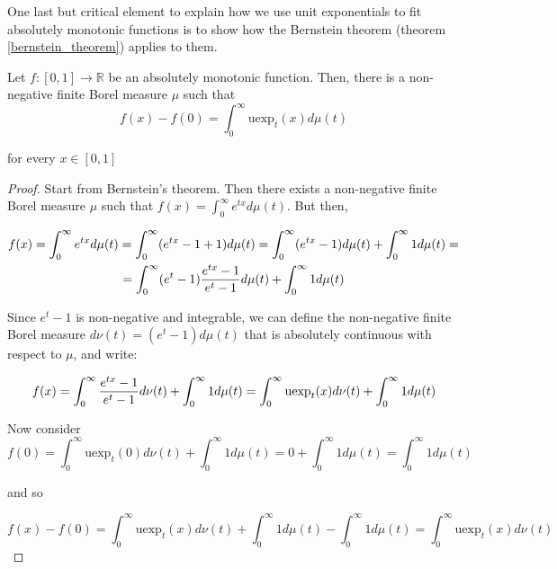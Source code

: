\documentclass[12pt,a4paper]{article}
\newcommand{\realfunction}[2] {{#1: #2 \rightarrow \mathbb{R}}}
\newcommand{\uexp}[1] {{\text{uexp}_{#1}}}
\begin{document}
One last but critical element to explain how we use unit exponentials to fit absolutely monotonic functions is to show how the Bernstein theorem (theorem \ref{bernstein_theorem}) applies to them.

\begin{theorem}
Let $\realfunction{f}{[0,1]}$ be an absolutely monotonic function. Then, there is a non-negative finite Borel measure $\mu$ such that
\begin{equation}
f(x) - f(0) = \int_{0}^{\infty} \uexp{t}(x) d \mu(t)
\end{equation}

\noindent for every $x \in [0,1]$
\end{theorem}

\begin{proof}
Start from Bernstein's theorem. Then there exists a non-negative finite Borel measure $\mu$ such that $f(x) = \int_{0}^{\infty} e^{tx} d \mu(t)$. But then,

\begin{multline}
f(x) = \int_{0}^{\infty} e^{tx} d \mu(t) = \int_{0}^{\infty} (e^{tx} - 1 + 1) d \mu(t) = \int_{0}^{\infty} (e^{tx} - 1) d \mu(t) + \int_{0}^{\infty} 1 d \mu(t) =\\
= \int_{0}^{\infty} (e^t - 1) {{e^{tx} - 1} \over {e^t - 1}} d \mu(t) + \int_{0}^{\infty} 1 d \mu(t)\\
\end{multline}

Since $e^t - 1$ is non-negative and integrable, we can define the non-negative finite Borel measure $d \nu(t) = (e^t - 1) d \mu(t)$ that is absolutely continuous with respect to $\mu$, and write:

\begin{equation}
f(x) =  \int_{0}^{\infty} {{e^{tx} - 1} \over {e^t - 1}} d \nu(t) + \int_{0}^{\infty} 1 d \mu(t) = \int_{0}^{\infty} \uexp{t}(x) d \nu(t) + \int_{0}^{\infty} 1 d \mu(t)
\end{equation}

Now consider 
\begin{equation}
f(0) =  \int_{0}^{\infty} \uexp{t}(0) d \nu(t) + \int_{0}^{\infty} 1 d \mu(t) = 0 + \int_{0}^{\infty} 1 d \mu(t) = \int_{0}^{\infty} 1 d \mu(t)
\end{equation}

\noindent and so

\begin{equation}
f(x) - f(0) = \int_{0}^{\infty} \uexp{t}(x) d \nu(t) + \int_{0}^{\infty} 1 d \mu(t) - \int_{0}^{\infty} 1 d \mu(t) = \int_{0}^{\infty} \uexp{t}(x) d \nu(t)
\end{equation}
\end{proof}
\end{document}
